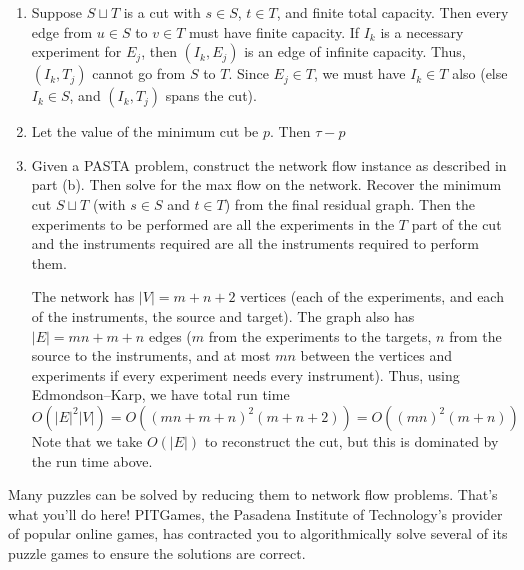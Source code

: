 \documentclass[12 pt, letterpaper]{hmcpset}
\begin{document}
\begin{solution}
	\begin{enumerate}
		\item[(e)] Suppose $S \sqcup T$ is a cut with $s \in S$, $t \in T$, and finite total capacity. Then every edge from $u \in S$ to $v \in T$ must have finite capacity. If $I_{k}$ is a necessary experiment for $E_{j}$, then $(I_{k}, E_{j})$ is an edge of infinite capacity. Thus, $(I_{k}, T_{j})$ cannot go from $S$ to $T$. Since $E_{j} \in T$, we must have $I_{k} \in T$ also (else $I_{k} \in S$, and $(I_{k}, T_{j})$ spans the cut).

		\item[(f)] Let the value of the minimum cut be $p$. Then $\tau - p$

		\item[(g)] Given a PASTA problem, construct the network flow instance as described in part (b). Then solve for the max flow on the network. Recover the minimum cut $S \sqcup T$ (with $s \in S$ and  $t \in T$) from the final residual graph. Then the experiments to be performed are all the experiments in the $T$ part of the cut and the instruments required are all the instruments required to perform them.

			The network has $\lvert V \rvert = m + n + 2$ vertices (each of the experiments, and each of the instruments, the source and target). The graph also has $\lvert E \rvert = mn + m + n$ edges ($m$ from the experiments to the targets, $n$ from the source to the instruments, and at most $mn$ between the vertices and experiments if every experiment needs every instrument). Thus, using Edmondson--Karp, we have total run time
			\[
				O(\lvert E \rvert^{2} \lvert V \rvert) = O((mn + m + n)^{2}(m + n + 2)) = O((mn)^{2}(m + n))
			\]
			Note that we take $O(\lvert E \rvert)$ to reconstruct the cut, but this is dominated by the run time above.
	\end{enumerate}
\end{solution}

\pagebreak

Many puzzles can be solved by reducing them to network
flow problems. That's what you'll do here! PITGames, the Pasadena Institute of
Technology's provider of popular online games, has contracted you to algorithmically solve several of its puzzle games to ensure the solutions are
correct.
\end{document}
